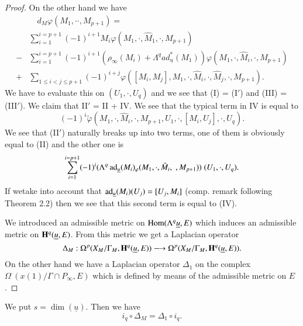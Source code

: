 \begin{proof}
On the other hand we have 
\begin{align*}
&\quad d_M \varphi (M_1, \cdot \cdot, M_{p+1} ) =\\
& \sum\limits^{i=p+1}_{i=1} (-1)^{i+1} M_i \varphi (M_1, \cdot , \hat{M}_1, \cdot , M_{p+1})  \tag{I$'$}\\
- & \sum\limits^{i=p+1}_{i=1} (-1)^{i+1} (\rho_\infty (M_i) + \Lambda^q ad^\ast_{\underline{u}} (M_1)) \varphi (M_1, \cdot , \hat{M}_i, \cdot, M_{p+1}) \tag{II$'$}\\
+ & \sum\limits_{1 \leqslant i < j \leqslant p +1} (-1)^{i+j} \varphi ([M_i, M_j], M_1, \cdot , \hat{M}_i, \cdot, \hat{M}_j, \cdot , M_{p+1}). \tag{III$'$}
\end{align*}
We have to evaluate this on $(U_1, \cdot , U_q)$ and we see that (I) = (I$'$) and (III) = (III$'$). We claim that II$'$ = II + IV. We see that the typical term in IV is equal to 
$$
(-1)^i \tilde{\varphi} (M_1, \cdot , \hat{M}_i,\cdot , M_{p+1}, U_1, \cdot , [M_i, U_j], \cdot , U_q).
$$
We see that (II$'$) naturally breaks up into two terms, one of them is obviously equal to (II) and the other one is 
$$
\sum\limits^{i=p+1}_{i=1} (-1)^i (\Lambda^q \operatorname{ad}_{\underline{u}} (M_i)_\varphi (M_1, \cdot , \hat{M}_i, \; , M_{p+1})) \; (U_1, \cdot , U_q).
$$
If we\pageoriginale take into account that $\operatorname{ad}_{\underline{u}} (M_i) (U_j) =[U_j, M_i]$ (comp. remark following Theorem 2.2) then we see that this second term is equal to (IV).

We introduced an admissible metric on $\operatorname{Hom} (\Lambda^q \underline{u}, E)$ which induces an admissible metric on $\mathbf{H}^q (\underline{u}, E)$. From this metric we get a Laplacian operator
$$
\Delta_M : \Omega^p (X_M /\Gamma_M, \mathbf{H}^q (\underline{u}, E)) \longrightarrow \Omega^p (X_M / \Gamma_M , \mathbf{H}^q (\underline{u}, E)).
$$
On the other hand we have a Laplacian operator $\Delta_1$ on the complex $\Omega^\cdot (x(1)/ \Gamma \cap P_\infty, E)$ which is defined by means of the admissible metric on $E$.
\end{proof}

\setcounter{lemma}{6}
\begin{lemma}\label{art5-lem2.7}
We put $s = \dim (\underline{u})$. Then we have
$$
i_q \circ \Delta_M = \Delta_1 \circ i_q.
$$
\end{lemma}


